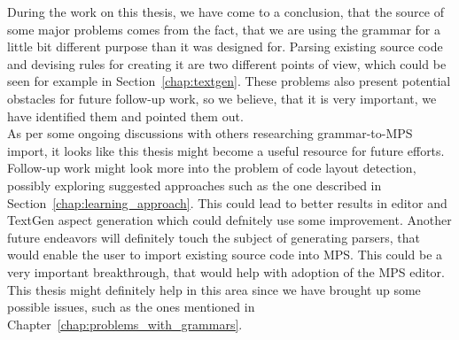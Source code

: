 During the work on this thesis, we have come to a conclusion, that the source of some major problems comes from the fact, that we are using the grammar for a little bit different purpose than it was designed for.
Parsing existing source code and devising rules for creating it are two different points of view, which could be seen for example in Section~\ref{chap:textgen}.
These problems also present potential obstacles for future follow-up work, so we believe, that it is very important, we have identified them and pointed them out.
\\

As per some ongoing discussions with others researching grammar-to-MPS import, it looks like this thesis might become a useful resource for future efforts.
Follow-up work might look more into the problem of code layout detection, possibly exploring suggested approaches such as the one described in Section~\ref{chap:learning_approach}.
This could lead to better results in editor and TextGen aspect generation which could defnitely use some improvement.
Another future endeavors will definitely touch the subject of generating parsers, that would enable the user to import existing source code into MPS.
This could be a very important breakthrough, that would help with adoption of the MPS editor.
This thesis might definitely help in this area since we have brought up some possible issues, such as the ones mentioned in Chapter~\ref{chap:problems_with_grammars}.
